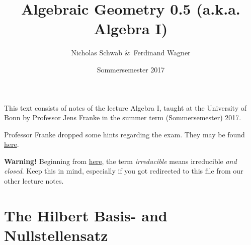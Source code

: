 \documentclass[DIV=14,parskip=full,pointednumbers]{scrartcl}
\title{Algebraic Geometry 0.5 (a.k.a. Algebra I)}
\author{Nicholas Schwab \&\ Ferdinand Wagner}
\date{Sommersemester 2017}
\theoremstyle{cthm}
\theoremstyle{cvarthm}
\theoremstyle{cdef}
\begin{document}
	
	\maketitle
	This text consists of notes of the lecture Algebra I, taught at the University of Bonn by Professor Jens Franke in the summer term (Sommersemester) 2017. 
	
	Professor Franke dropped some hints regarding the exam. They may be found \hyperref[rem:examHints]{here}.
	
	\textbf{Warning!} Beginning from \hyperref[rem:irreducibleNotation]{here}, the term \emph{irreducible} means irreducible \emph{and closed}. Keep this in mind, especially if you got redirected to this file from our other lecture notes.
	\tableofcontents
	
	\section{The Hilbert Basis- and Nullstellensatz}
\end{document}
